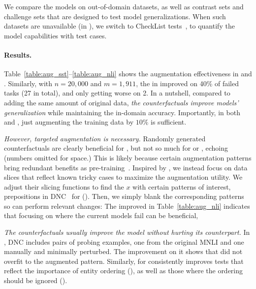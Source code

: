 We compare the models on out-of-domain datasets, as well as contrast sets and challenge sets that are designed to test model generalizations.
When such datasets are unavailable (in \qqp), we switch to CheckList tests~\cite{checklist:acl20}, to quantify the model capabilities with test cases.

\paragraph{Results.}
Table~\ref{table:aug_sst}--\ref{table:aug_nli} shows the augmentation effectiveness in \sst and \nli. 
Similarly, with $n=20,000$ and $m=1,911$, the \maug in \qqp improved on 40\% of \mcomp failed tasks (27 in total), and only getting worse on 2.
In a nutshell, compared to adding the same amount of original data, \emph{the counterfactuals improve models' generalization} while maintaining the in-domain accuracy.
Importantly, in both \nli and \qqp, just augmenting the training data by $10\%$ is sufficient.



\emph{However, targeted augmentation is necessary.}
Randomly generated counterfactuals are clearly beneficial for \sst, but not so much for \nli or \qqp, echoing \citet{huang2020counterfactually} (numbers omitted for space.)
This is likely because certain augmentation patterns bring redundant benefits as pre-training~\cite{longpre2020effective}.
Inspired by \citet{chen2019slice}, we instead focus on data slices that reflect known tricky cases to maximize the augmentation utility.
We adjust their slicing functions to find the $x$ with certain patterns of interest, \eg prepositions in DNC~\cite{kim2019probing} for \nli ().
Then, we simply blank the corresponding patterns so \sysname can perform relevant changes: 
The improved \maug in Table~\ref{table:aug_nli} indicates that focusing on where the current models fail can be beneficial, 




\emph{The counterfactuals usually improve the model without hurting its counterpart.}
In \nli, DNC includes pairs of probing examples, one from the original MNLI and one manually and minimally perturbed.
The improvement on it shows that \maug did not overfit to the augmented pattern.
Similarly, \maug for \qqp consistently improves tests that reflect the importance of entity ordering (), as well as those where the ordering should be ignored ().


